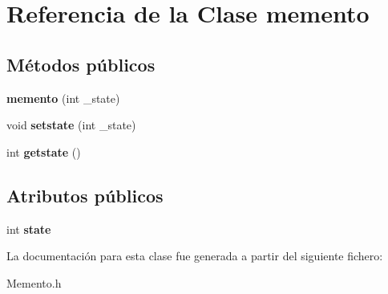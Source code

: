 \hypertarget{classmemento}{}\section{Referencia de la Clase memento}
\label{classmemento}
\subsection*{Métodos públicos}
\begin{DoxyCompactItemize}
\item 
\mbox{\label{classmemento_ae8666cc3ec4c14ad780bbec48f2af2f0}} 
{\bfseries memento} (int \+\_\+state)
\item 
\mbox{\label{classmemento_a9b0eadfbfa5c6c02ec24761040abb0e2}} 
void {\bfseries setstate} (int \+\_\+state)
\item 
\mbox{\label{classmemento_ab214a3a4b4d638b5921765cc78ada85e}} 
int {\bfseries getstate} ()
\end{DoxyCompactItemize}
\subsection*{Atributos públicos}
\begin{DoxyCompactItemize}
\item 
\mbox{\label{classmemento_a813eb041b883fa612bf0362c5c3c158d}} 
int {\bfseries state}
\end{DoxyCompactItemize}


La documentación para esta clase fue generada a partir del siguiente fichero\+:\begin{DoxyCompactItemize}
\item 
Memento.\+h\end{DoxyCompactItemize}
